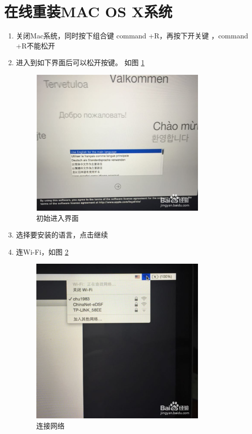 \documentclass{article}
\begin{document}
\section{在线重装MAC OS X系统}
\begin{enumerate}
\item 关闭Mac系统，同时按下组合键 command +R，再按下开关键 ，command +R不能松开

\item 进入到如下界面后可以松开按键。
如图 \ref{chushi} 
 
  \begin{figure}[!htb] %
  \centering
  \includegraphics[width=0.8\textwidth]{figures/chushi.jpg}
    \caption{初始进入界面}
 \label{chushi}

   \end{figure}
\item 选择要安装的语言，点击继续
\item 连Wi-Fi，如图 \ref{wifi}
  \begin{figure}[!htb] %
  \centering
  \includegraphics[width=0.8\textwidth]{figures/wifi.jpg}
 \caption{连接网络}
 \label{wifi}
  

\end{figure}
\end{enumerate}
\end{document}
